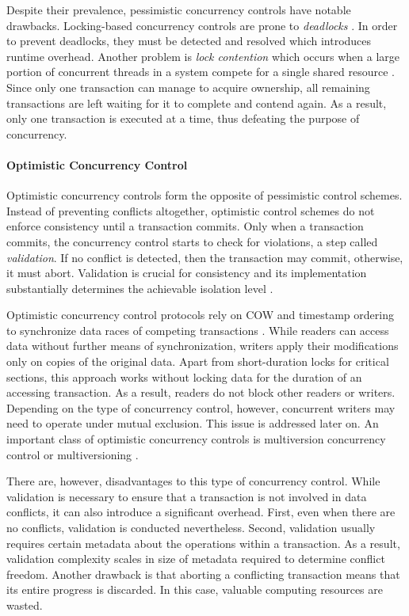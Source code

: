Despite their prevalence, pessimistic concurrency controls have notable
drawbacks. Locking-based concurrency controls are prone to \emph{deadlocks}
\cite{bernstein1981concurrency, kung1981optimistic}. In order to prevent
deadlocks, they must be detected and resolved which introduces runtime overhead.
Another problem is \emph{lock contention} which occurs when a large portion of
concurrent threads in a system compete for a single shared resource
\cite{berenson1995critique, sadoghi2014reducing}. Since only one transaction can
manage to acquire ownership, all remaining transactions are left waiting for it
to complete and contend again. As a result, only one transaction is executed at
a time, thus defeating the purpose of concurrency.

\paragraph{Optimistic Concurrency Control}

Optimistic concurrency controls form the opposite of pessimistic control
schemes. Instead of preventing conflicts altogether, optimistic control schemes
do not enforce consistency until a transaction commits. Only when a transaction
commits, the concurrency control starts to check for violations, a step called
\emph{validation}. If no conflict is detected, then the transaction may commit,
otherwise, it must abort. Validation is crucial for consistency and its
implementation substantially determines the achievable isolation level
\cite{larson2011high}.

Optimistic concurrency control protocols rely on \ac{COW} and timestamp
ordering to synchronize data races of competing transactions
\cite{bernstein1981concurrency, kung1981optimistic}. While readers can access
data without further means of synchronization, writers apply their modifications
only on copies of the original data. Apart from short-duration locks for
critical sections, this approach works without locking data for the duration of
an accessing transaction. As a result, readers do not block other readers or
writers. Depending on the type of concurrency control, however, concurrent
writers may need to operate under mutual exclusion. This issue is addressed
later on. An important class of optimistic concurrency controls is multiversion
concurrency control or multiversioning \cite{reed1978naming,
bernstein1983multiversion}.

There are, however, disadvantages to this type of concurrency control. While
validation is necessary to ensure that a transaction is not involved in data
conflicts, it can also introduce a significant overhead. First, even when there
are no conflicts, validation is conducted nevertheless. Second, validation
usually requires certain metadata about the operations within a transaction. As
a result, validation complexity scales in size of metadata required to
determine conflict freedom. Another drawback is that aborting a conflicting
transaction means that its entire progress is discarded. In this case, valuable
computing resources are wasted.

